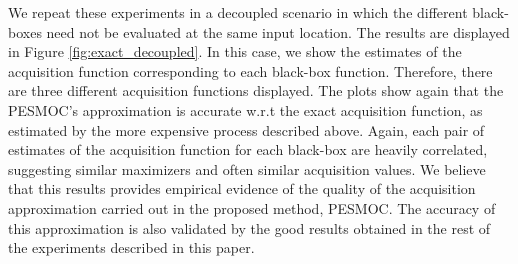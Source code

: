 \documentclass[review,preprint,12pt]{elsarticle}
\providecommand{\DIFdelbegin}{} %
\begin{document}
We repeat these experiments in a decoupled scenario in which the different black-boxes need not be evaluated
at the same input location. The results are displayed in Figure \ref{fig:exact_decoupled}. In this case, we
show the estimates of the acquisition function corresponding to each black-box function. Therefore,
there are three different acquisition functions displayed. The plots show 
again that the PESMOC's approximation is accurate w.r.t the exact acquisition function, as  estimated by the 
more expensive process described above. Again, each pair of estimates of the acquisition function for each 
black-box are heavily correlated, suggesting similar maximizers and often similar acquisition values. We 
believe that this results provides empirical evidence of the quality of the acquisition approximation carried out 
in the proposed method, PESMOC. The accuracy of this approximation is also validated by the good results 
obtained in the rest of the experiments described in this paper.

\DIFdelbegin %
\end{document}
